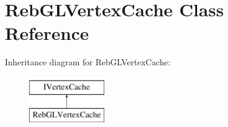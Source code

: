 \hypertarget{class_reb_g_l_vertex_cache}{}\section{Reb\+G\+L\+Vertex\+Cache Class Reference}
\label{class_reb_g_l_vertex_cache}
Inheritance diagram for Reb\+G\+L\+Vertex\+Cache\+:\begin{figure}[H]
\begin{center}
\leavevmode
\includegraphics[height=2.000000cm]{class_reb_g_l_vertex_cache}
\end{center}
\end{figure}
